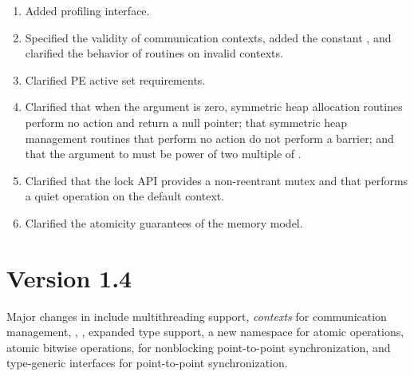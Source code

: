 \begin{enumerate}
  ,
  , , and
  .
%
%
\item Added \openshmem profiling interface.
%
%
\item Specified the validity of communication contexts, added the constant
  , and clarified the behavior of
   routines on invalid contexts.
%
%
\item Clarified \ac{PE} active set requirements.
%
%
\item Clarified that when the  argument is zero, symmetric heap
    allocation routines perform no action and return a null pointer; that
    symmetric heap management routines that perform no action do not perform a
    barrier; and that the  argument to  must
    be power of two multiple of .
%
%
\item Clarified that the \openshmem lock \ac{API} provides a non-reentrant mutex and
    that  performs a quiet operation on the default
    context.
%
%
\item Clarified the atomicity guarantees of the \openshmem memory model.
%
%
\end{enumerate}

\section{Version 1.4}
Major changes in \openshmem[1.4] include
multithreading support,
\emph{contexts} for communication management,
,
,
expanded type support,
a new namespace for atomic operations,
atomic bitwise operations,
 for nonblocking point-to-point synchronization,
and \Cstd[11] type-generic interfaces for point-to-point synchronization.


